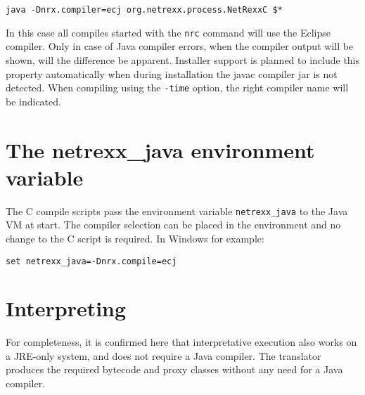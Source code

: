 \begin{verbatim}
java -Dnrx.compiler=ecj org.netrexx.process.NetRexxC $*
\end{verbatim}
 
In this case all compiles started with the \texttt{nrc} command will use the Eclipse compiler. Only in case of Java compiler errors, when the compiler output will be shown, will the difference be apparent. Installer support is planned to include this property automatically when during \nr{} installation the javac compiler jar is not detected. When compiling using the \texttt{-time} option, the right compiler name will be indicated.
\section{The netrexx\_java environment variable}
The \nr{}C compile scripts pass the environment variable \texttt{netrexx\_java} to the Java VM at start. The compiler selection can be placed in the environment and no change to the \nr{}C script is required. In Windows for example:
\begin{verbatim}
set netrexx_java=-Dnrx.compile=ecj
\end{verbatim}

\section{Interpreting}
For completeness, it is confirmed here that interpretative execution also works on a JRE-only system, and does not require a Java compiler. The \nr{} translator produces the required bytecode and proxy classes without any need for a Java compiler.
 